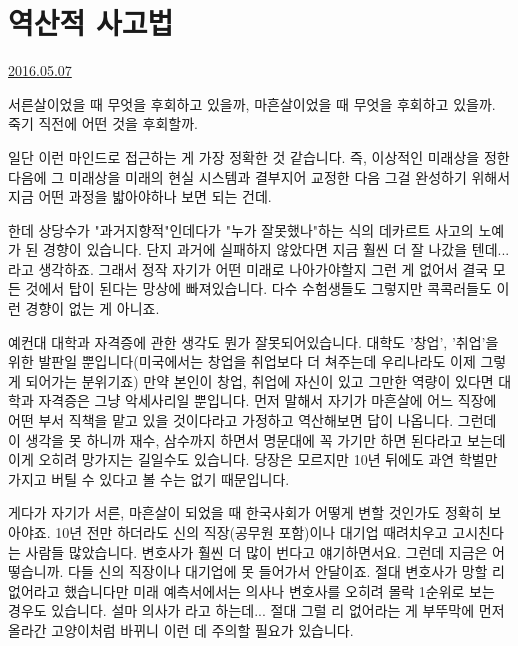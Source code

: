 \section{역산적 사고법}
\href{https://www.kockoc.com/Apoc/764294}{2016.05.07}

\vspace{5mm}

서른살이었을 때 무엇을 후회하고 있을까,
마흔살이었을 때 무엇을 후회하고 있을까.
죽기 직전에 어떤 것을 후회할까.
\vspace{5mm}

일단 이런 마인드로 접근하는 게 가장 정확한 것 같습니다.
즉, 이상적인 미래상을 정한 다음에 그 미래상을 미래의 현실 시스템과 결부지어 교정한 다음
그걸 완성하기 위해서 지금 어떤 과정을 밟아야하나 보면 되는 건데.
\vspace{5mm}

한데 상당수가 "과거지향적"인데다가 "누가 잘못했나"하는 식의 데카르트 사고의 노예가 된 경향이 있습니다.
단지 과거에 실패하지 않았다면 지금 훨씬 더 잘 나갔을 텐데... 라고 생각하죠.
그래서 정작 자기가 어떤 미래로 나아가야할지 그런 게 없어서 결국 모든 것에서 탑이 된다는 망상에 빠져있습니다.
다수 수험생들도 그렇지만 콕콕러들도 이런 경향이 없는 게 아니죠.
\vspace{5mm}

예컨대 대학과 자격증에 관한 생각도 뭔가 잘못되어있습니다.
대학도 '창업', '취업'을 위한 발판일 뿐입니다(미국에서는 창업을 취업보다 더 쳐주는데 우리나라도 이제 그렇게 되어가는 분위기죠)
만약 본인이 창업, 취업에 자신이 있고 그만한 역량이 있다면 대학과 자격증은 그냥 악세사리일 뿐입니다.
먼저 말해서 자기가 마흔살에 어느 직장에 어떤 부서 직책을 맡고 있을 것이다라고 가정하고 역산해보면 답이 나옵니다.
그런데 이 생각을 못 하니까 재수, 삼수까지 하면서 명문대에 꼭 가기만 하면 된다라고 보는데 이게 오히려 망가지는 길일수도 있습니다.
당장은 모르지만 10년 뒤에도 과연 학벌만 가지고 버틸 수 있다고 볼 수는 없기 때문입니다.
\vspace{5mm}

게다가 자기가 서른, 마흔살이 되었을 때 한국사회가 어떻게 변할 것인가도 정확히 보아야죠.
10년 전만 하더라도 신의 직장(공무원 포함)이나 대기업 때려치우고 고시친다는 사람들 많았습니다. 변호사가 훨씬 더 많이 번다고 얘기하면서요.
그런데 지금은 어떻습니까. 다들 신의 직장이나 대기업에 못 들어가서 안달이죠.
절대 변호사가 망할 리 없어라고 했습니다만 미래 예측서에서는 의사나 변호사를 오히려 몰락 1순위로 보는 경우도 있습니다.
설마 의사가 라고 하는데... 절대 그럴 리 없어라는 게 부뚜막에 먼저 올라간 고양이처럼 바뀌니 이런 데 주의할 필요가 있습니다.
\vspace{5mm}


